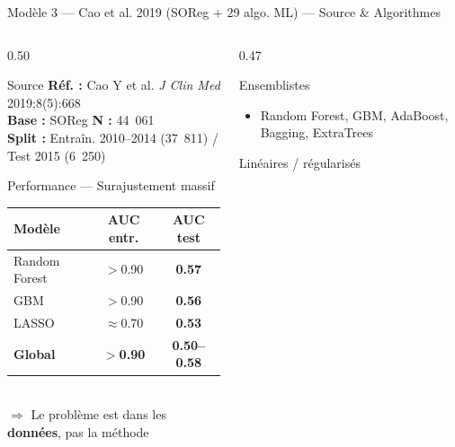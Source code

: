 \documentclass[aspectratio=169]{beamer}
\newcommand{\tightlist}{%
  \setlength{\itemsep}{1pt}\setlength{\parskip}{0pt}%
  \setlength{\parsep}{0pt}\setlength{\topsep}{2pt}}
\begin{document}
\begin{frame}[shrink=5]{Modèle 3 --- Cao et al. 2019 (SOReg + 29 algo. ML) --- Source \& Algorithmes}
  \begin{columns}[T]
    \begin{column}{0.50\textwidth}
      \begin{block}{Source}
        \footnotesize
        \textbf{Réf. :} Cao Y et al. \textit{J Clin Med} 2019;8(5):668\\
        \textbf{Base :} SOReg \quad \textbf{N :} 44~061\\
        \textbf{Split :} Entraîn. 2010--2014 (37~811) / Test 2015 (6~250)
      \end{block}
      \vspace{0.15em}
      \begin{alertblock}{Performance --- Surajustement massif}
        \footnotesize
        \begin{tabular}{lcc}
          \toprule
          \textbf{Modèle} & \textbf{AUC entr.} & \textbf{AUC test} \\
          \midrule
          Random Forest & $>$0.90 & \textcolor{rougealerte}{\textbf{0.57}} \\
          GBM           & $>$0.90 & \textcolor{rougealerte}{\textbf{0.56}} \\
          LASSO         & $\approx$0.70 & \textcolor{rougealerte}{\textbf{0.53}} \\
          \midrule
          \textbf{Global} & $>$\textbf{0.90} & \textbf{0.50--0.58} \\
          \bottomrule
        \end{tabular}
        \vspace{3pt}\\
        $\Rightarrow$ Le problème est dans les \textbf{données}, pas la méthode
      \end{alertblock}
    \end{column}
    \begin{column}{0.47\textwidth}
      \begin{block}{Ensemblistes}
        \footnotesize\tightlist
        \begin{itemize}\tightlist
          \item Random Forest, GBM, AdaBoost, Bagging, ExtraTrees
        \end{itemize}
      \end{block}
      \vspace{0.1em}
      \begin{block}{Linéaires / régularisés}

\end{block}
\end{column}
\end{columns}
\end{frame}
\end{document}
